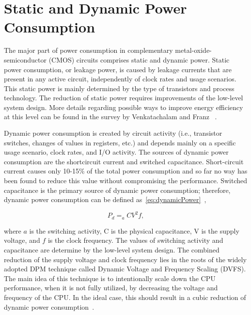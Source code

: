 \documentclass[runningheads,a4paper]{llncs}
\begin{document}


\section{Static and Dynamic Power Consumption}\label{sec:power}
The  major  part  of  power  consumption  in  complementary  metal-oxide-semiconductor (CMOS)  circuits  comprises  static  and  dynamic  power. Static  power  consumption,  or leakage power,  is caused by leakage currents that are present in any active circuit,  independently of clock rates and usage scenarios.  This static power is mainly determined by the type of transistors and process technology. The reduction of static power requires improvements of the low-level system design.  More details regarding possible ways to improve energy efficiency at this level can be found in the survey by Venkatachalam and Franz ~\cite{venkatachalam2005power}.


Dynamic power consumption is created by circuit activity (i.e., transistor switches, changes of values in registers, etc.) and depends mainly on a specific usage scenario, clock rates, and I/O activity. The sources of dynamic power consumption are the shortcircuit current and switched capacitance. Short-circuit current causes only 10-15\% of the total power consumption and so far no way has been found to reduce this value without compromising the performance. Switched capacitance is the primary source of dynamic power consumption; therefore, dynamic power consumption can be defined as~\ref{eq:dynamicPower}~\cite{vogelsang2010understanding},

\begin{equation}\label{eq:dynamicPower}
    P_d = _a CV^2 f,
\end{equation}

where $a$ is the switching activity, C is the physical capacitance, V is the supply voltage, and $f$ is the clock frequency. The values of switching activity and capacitance are determine by the low-level system design. The combined reduction of the supply voltage and clock frequency lies in the roots of the widely adopted DPM technique called Dynamic Voltage and Frequency Scaling (DVFS). The main idea of this technique is to intentionally scale down the CPU performance, when it is not fully utilized, by decreasing the voltage and frequency of the CPU. In the ideal case, this should result in a cubic reduction of dynamic power consumption~\cite{beloglazov2013energy}.
\end{document}
